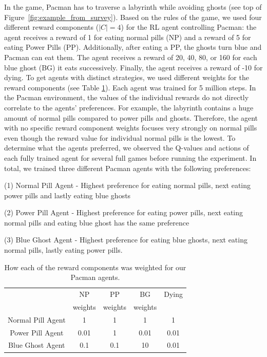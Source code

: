 \documentclass[runningheads]{llncs}
\begin{document}
In the game, Pacman has to traverse a labyrinth while avoiding ghosts (see top of Figure~\ref{fig:example_from_survey}).
Based on the rules of the game, we used four different reward components ($|C|=4$) for the RL agent controlling Pacman: the agent receives a reward of 1 for eating normal pills (NP) and a reward of 5 for eating Power Pills (PP).
Additionally, after eating a PP, the ghosts turn blue and Pacman can eat them. 
The agent receives a reward of 20, 40, 80, or 160 for each blue ghost (BG) it eats successively.
Finally, the agent receives a reward of -10 for dying.
To get agents with distinct strategies, we used different weights for the reward components (see Table \ref{tab:reward setting pacman}).
Each agent was trained for 5 million steps.
In the Pacman environment, the values of the individual rewards do not directly correlate to the agents' preferences.
For example, the labyrinth contains a huge amount of normal pills compared to power pills and ghosts. 
Therefore, the agent with no specific reward component weights focuses very strongly on normal pills even though the reward value for individual normal pills is the lowest.
To determine what the agents preferred, we observed the Q-values and actions of each fully trained agent for several full games before running the experiment.
In total, we trained three different Pacman agents with the following preferences: 

(1) Normal Pill Agent - Highest preference for eating normal pills, next eating power pills and lastly eating blue ghosts

(2) Power Pill Agent - Highest preference for eating power pills, next eating normal pills and eating blue ghost has the same preference

(3) Blue Ghost Agent -  Highest preference for eating blue ghosts, next eating normal pills,  lastly eating power pills.

\begin{table}[t]
  \centering
  \caption{How each of the reward components was weighted for our Pacman agents.}
   \label{tab:reward setting pacman}
  \begin{tabular}{c|c c c c }
     \hline
         &  NP  &  PP & BG & Dying  \\
          & weights & weights & weights \\
       \hline
       Normal Pill Agent & 1 & 1 & 1 & 1  \\
         
        Power Pill Agent & 0.01 & 1 & 0.01 & 0.01 \\
        
       Blue Ghost Agent & 0.1 & 0.1 & 10 & 0.01  \\
       \hline
        
   \end{tabular}
   \vspace{-0.2cm}
\end{table}
\end{document}
